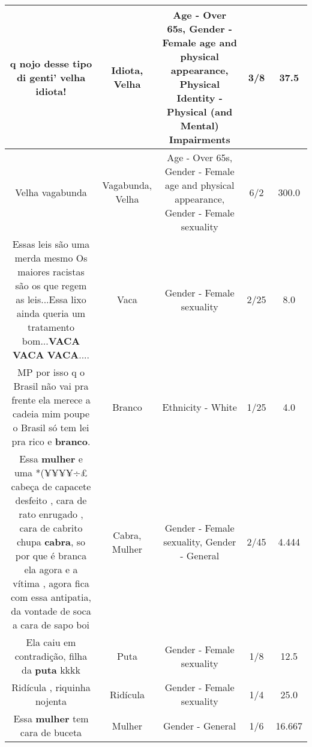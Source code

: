 \documentclass[11pt]{article}
\newlength\mylength
\begin{document}
\begin{center}
\begin{longtable}{|C{.65\mylength}|C{.30\mylength}|C{.12\mylength}|C{.12\mylength}|C{.12\mylength}|}
  \small q nojo desse tipo di genti' \textbf{v\textbf{elha}} \textbf{idiota}!\normalsize   & Idiota, Velha & Age - Over 65s, Gender - Female age and physical appearance, Physical Identity - Physical (and Mental) Impairments & 3/8 & 37.5 \\  \hline
  \small Velha vagabunda\normalsize   & Vagabunda, Velha & Age - Over 65s, Gender - Female age and physical appearance, Gender - Female sexuality & 6/2 & 300.0 \\  \hline
  \small Essas leis são uma merda mesmo Os maiores racistas são os que regem as leis...Essa lixo ainda queria um tratamento bom...\textbf{VACA} \textbf{VACA} \textbf{VACA}....\normalsize   & Vaca & Gender - Female sexuality & 2/25 & 8.0 \\  \hline
  \small MP por isso q o Brasil não vai pra frente ela merece a cadeia mim poupe o Brasil só tem lei pra rico e \textbf{branco}.\normalsize   & Branco & Ethnicity - White & 1/25 & 4.0 \\  \hline
  \small Essa \textbf{mulher} e uma *\@(\@¥¥¥¥÷£ cabeça de capacete desfeito , cara de rato enrugado , cara de cabrito chupa \textbf{cabra}, so por que é branca ela agora e a vítima , agora fica com essa antipatia, da vontade de soca a cara de sapo boi\normalsize   & Cabra, Mulher & Gender - Female sexuality, Gender - General & 2/45 & 4.444 \\  \hline
  \small Ela caiu em contradição, filha da \textbf{puta} kkkk\normalsize   & Puta & Gender - Female sexuality & 1/8 & 12.5 \\  \hline
  \small Ridícula , riquinha nojenta\normalsize   & Ridícula & Gender - Female sexuality & 1/4 & 25.0 \\  \hline
  \small Essa \textbf{mulher} tem cara de buceta\normalsize   & Mulher & Gender - General & 1/6 & 16.667 \\  \hline

\end{longtable}
\end{center}
\end{document}

